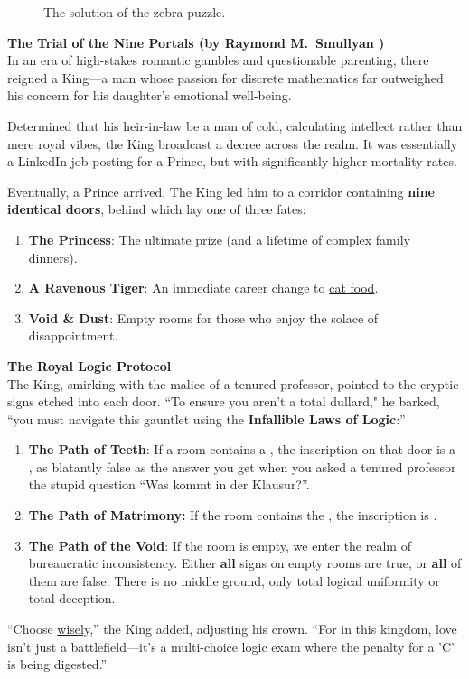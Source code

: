 \begin{figure}[!ht]
  \centering
  \caption{The solution of the zebra puzzle.}
  \label{fig:zebra}
\end{figure}

\pagebreak
\vspace*{\fill}

\pagebreak

\exerciseEng
\textbf{\large The Trial of the Nine Portals (by Raymond M.~Smullyan \cite{smullyan:1982})} \\
In an era of high-stakes romantic gambles and questionable parenting, there reigned a King—a man whose passion
for discrete mathematics far outweighed his concern for his daughter’s emotional well-being.  

Determined that his heir-in-law be a man of cold, calculating intellect rather than mere royal vibes, the
King broadcast a decree across the realm. It was essentially a LinkedIn job posting for a Prince, but with
significantly higher mortality rates. 

Eventually, a Prince arrived. The King led him to a corridor containing \textbf{nine identical doors}, behind
which lay one of three fates: 
\begin{enumerate}
\item \textbf{The Princess}:     The ultimate prize (and a lifetime of complex family dinners).
\item \textbf{A Ravenous Tiger}: An immediate career change to \href{https://www.whiskas.de/}{cat food}.
\item \textbf{Void \& Dust}:     Empty rooms for those who enjoy the solace of disappointment.
\end{enumerate}

\noindent
\textbf{\large The Royal Logic Protocol} \\
The King, smirking with the malice of a tenured professor, pointed to the cryptic signs etched into each
door. ``To ensure you aren't a total dullard," he barked, ``you must navigate this gauntlet using the
\textbf{Infallible Laws of Logic}:'' 
\begin{enumerate}
\item \textbf{The Path of Teeth}: If a room contains a , the inscription on that door is a
      , as blatantly false as the answer you get when you asked a tenured professor the stupid
      question ``Was kommt in der Klausur?''.
\item \textbf{The Path of Matrimony:} If the room contains the , the inscription is
      .
\item \textbf{The Path of the Void}: If the room is empty, we enter the realm of bureaucratic inconsistency.
      Either \textbf{all} signs on empty rooms are true, or \textbf{all} of them are false. There is no middle
      ground, only total logical uniformity or total deception. 
\end{enumerate}
``Choose \href{https://www.youtube.com/watch?v=c3RN9zz77Cs}{wisely},'' the King added, adjusting his crown.
``For in this kingdom, love isn't just a battlefield—it's a multi-choice logic exam where the penalty for a 'C'
is being digested.''  

